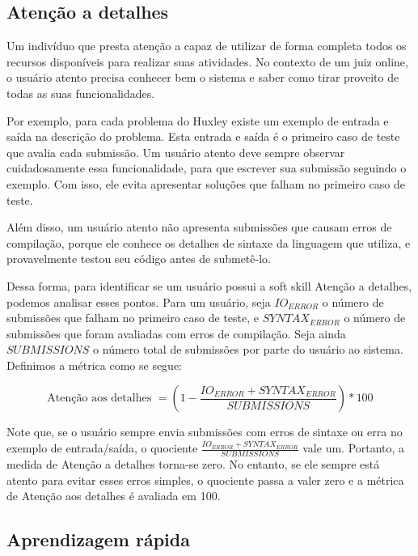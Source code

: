 \subsection{Atenção a detalhes}

Um indivíduo que presta atenção a capaz de utilizar de forma completa todos os recursos disponíveis para realizar suas atividades. No contexto de um juiz online, o usuário atento precisa conhecer bem o sistema e saber como tirar proveito de todas as suas funcionalidades.

Por exemplo, para cada problema do Huxley existe um exemplo de entrada e saída na descrição do problema. Esta entrada e saída é o primeiro caso de teste que avalia cada submissão. Um usuário atento deve sempre observar cuidadosamente essa funcionalidade, para que escrever sua submissão seguindo o exemplo. Com isso, ele evita apresentar soluções que falham no primeiro caso de teste.

Além disso, um usuário atento não apresenta submissões que causam erros de compilação, porque ele conhece os detalhes de sintaxe da linguagem que utiliza, e provavelmente testou seu código antes de submetê-lo.

Dessa forma, para identificar se um usuário possui a soft skill Atenção a detalhes, podemos analisar esses pontos. Para um usuário, seja $IO_{ERROR}$ o número de submissões que falham no primeiro caso de teste, e $SYNTAX_{ERROR}$ o número de submissões que foram avaliadas com erros de compilação. Seja ainda $SUBMISSIONS$ o número total de submissões por parte do usuário ao sistema. Definimos a métrica como se segue:

\begin{equation} \label{m:atencao}
\mbox{Atenção aos detalhes } = \left(1 - \frac {IO_{ERROR} + SYNTAX_{ERROR}}{SUBMISSIONS}\right) * 100
\end{equation}

Note que, se o usuário sempre envia submissões com erros de sintaxe ou erra no exemplo de entrada/saída, o quociente 
$\frac {IO_{ERROR} + SYNTAX_{ERROR}}{SUBMISSIONS}$ vale um. Portanto, a medida de Atenção a detalhes torna-se zero.
No entanto, se ele sempre está atento para evitar esses erros simples, o quociente passa a valer zero e a métrica de Atenção aos detalhes é avaliada em 100.

\subsection{Aprendizagem rápida}

